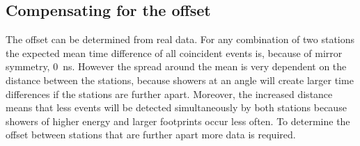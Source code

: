 \subsection{Compensating for the offset}

The offset can be determined from real data. For any combination of two
stations the expected mean time difference of all coincident events is,
because of mirror symmetry, \SI{0}{\nano\second}. However the spread
around the mean is very dependent on the distance between the stations,
because showers at an angle will create larger time differences if the
stations are further apart. Moreover, the increased distance means that
less events will be detected simultaneously by both stations because
showers of higher energy and larger footprints occur less often. To
determine the offset between stations that are further apart more data
is required.
